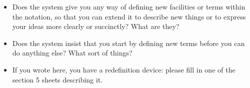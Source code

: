 \begin{itemize}
        \begin{itemize}
        \item Does the system give you any way of defining new facilities or terms within the notation, so that you can extend it to describe new things or to express your ideas more clearly or succinctly? What are they?
        \item Does the system insist that you start by defining new terms before you can do anything else? What sort of things?
        \item If you wrote here, you have a redefinition device: please fill in one of the section 5 sheets describing it.
        \end{itemize}
    \end{itemize}